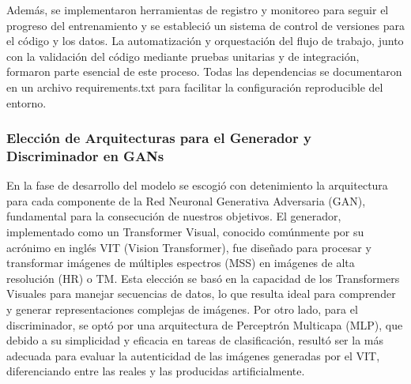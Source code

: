             
                Además, se implementaron herramientas de registro y monitoreo para seguir el progreso del entrenamiento y se estableció un sistema de control de versiones para el código y los datos. La automatización y orquestación del flujo de trabajo, junto con la validación del código mediante pruebas unitarias y de integración, formaron parte esencial de este proceso. Todas las dependencias se documentaron en un archivo requirements.txt para facilitar la configuración reproducible del entorno.











            \subsubsection{Elección de Arquitecturas para el Generador y Discriminador en GANs}
                En la fase de desarrollo del modelo se escogió con detenimiento la arquitectura para cada componente de la Red Neuronal Generativa Adversaria (GAN), fundamental para la consecución de nuestros objetivos. El generador, implementado como un Transformer Visual, conocido comúnmente por su acrónimo en inglés VIT (Vision Transformer), fue diseñado para procesar y transformar imágenes de múltiples espectros (MSS) en imágenes de alta resolución (HR) o TM. Esta elección se basó en la capacidad de los Transformers Visuales para manejar secuencias de datos, lo que resulta ideal para comprender y generar representaciones complejas de imágenes. Por otro lado, para el discriminador, se optó por una arquitectura de Perceptrón Multicapa (MLP), que debido a su simplicidad y eficacia en tareas de clasificación, resultó ser la más adecuada para evaluar la autenticidad de las imágenes generadas por el VIT, diferenciando entre las reales y las producidas artificialmente. 
            
